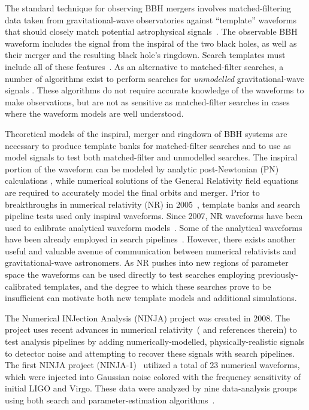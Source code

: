 The standard technique for observing BBH mergers
involves matched-filtering data taken from gravitational-wave observatories 
against ``template'' waveforms that should closely match potential 
astrophysical signals~\cite{Wainstein:1962,Wainstein:1968,Allen:2005fk}. The
observable BBH waveform includes the signal from the inspiral of the
two black holes, as well as their merger and the resulting black
hole's ringdown. Search templates must include all of these
features~\cite{Buonanno:2009zt,Brown:2012nn}.  As an alternative to
matched-filter searches, a number of algorithms exist to perform
searches for \emph{unmodelled} gravitational-wave signals
\cite{Klimenko:2008fu,Searle:2007uv,Sutton:2009gi}. These algorithms
do not require accurate knowledge of the waveforms to make
observations, but are not as sensitive as matched-filter searches in
cases where the waveform models are well understood.

Theoretical models of the inspiral, merger and ringdown of BBH systems
are necessary to produce template banks for matched-filter searches
and to use as model signals to test both matched-filter and unmodelled
searches.  The inspiral portion of the waveform can be modeled by
analytic post-Newtonian (PN) calculations
\cite{Blanchet:2006zz,Buonanno:2009zt}, while numerical solutions of
the General Relativity field equations are required to accurately
model the final orbits and merger.  Prior to breakthroughs in
numerical relativity (NR) in
2005~\cite{Pretorius:2005gq,Campanelli:2005dd, Baker:2005vv}, template
banks and search pipeline tests used only inspiral waveforms.  Since
2007, NR waveforms have been used to calibrate analytical waveform
models~\cite{Buonanno:2007pf,Damour:2009kr,Pan:2011gk,Taracchini:2012ig,
Ajith:2009bn,Santamaria:2010yb,Damour:2012ky,Taracchini:2013rva}. Some
of the analytical waveforms have been already employed in search
pipelines~\cite{Aasi:2012rja}.  However, there exists another
useful and valuable avenue of communication between numerical
relativists and gravitational-wave astronomers.  As NR pushes into new
regions of parameter space the waveforms can be used directly to test
searches employing previously-calibrated templates, and the degree to
which these searches prove to be insufficient can motivate both new
template models and additional simulations.

The Numerical INJection Analysis (NINJA) project was created in 2008. 
The project uses recent 
advances in numerical relativity~(\cite{Centrella:2010mx} and references
therein) to test analysis 
pipelines by adding numerically-modelled, physically-realistic signals to 
detector noise and attempting to recover these signals with search pipelines.
The first NINJA project (NINJA-1)~\cite{Aylott:2009ya} utilized a total of
23 numerical waveforms, which were injected into Gaussian noise colored with
the frequency sensitivity of initial LIGO and Virgo. These data were
analyzed by nine data-analysis groups using both search and
parameter-estimation algorithms~\cite{Aylott:2009ya}.  

